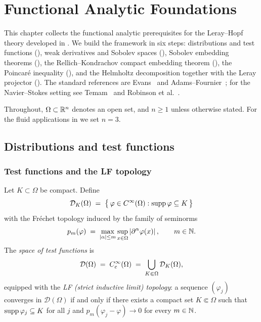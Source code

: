 \chapter{Functional Analytic Foundations}\label{ch:foundations}

This chapter collects the functional analytic prerequisites for the Leray--Hopf theory
developed in .
We build the framework in six steps: distributions and test functions
(), weak derivatives and Sobolev spaces (),
Sobolev embedding theorems (), the Rellich--Kondrachov compact
embedding theorem (), the Poincar\'{e} inequality (),
and the Helmholtz decomposition together with the Leray projector ().
The standard references are Evans~\cite{evans2010} and Adams--Fournier~\cite{adams2003};
for the Navier--Stokes setting see Temam~\cite{temam2001} and Robinson et al.\
\cite{robinson2016}.

Throughout, $\Omega \subset \mathbb{R}^{n}$ denotes an open set, and $n \ge 1$ unless otherwise
stated.
For the fluid applications in  we set $n = 3$.

\section{Distributions and test functions}\label{sec:distributions}

\subsection{Test functions and the LF topology}

\begin{definition}\label{def:test-functions}
  Let $K \subset \Omega$ be compact.  Define
  \[
    \mathcal{D}_{K}(\Omega)
    \;=\;
    \bigl\{\,\varphi \in C^{\infty}(\Omega) : \operatorname{supp} \varphi \subseteq K\,\bigr\}
  \]
  with the Fr\'{e}chet topology induced by the family of seminorms
  \[
    p_{m}(\varphi)
    \;=\;
    \max_{\left\lvert \alpha \right\rvert \le m}
    \sup_{x \in \Omega} \left\lvert \partial^{\alpha}\varphi(x) \right\rvert,
    \qquad m \in \mathbb{N}.
  \]
  The \emph{space of test functions} is
  \[
    \mathcal{D}(\Omega)
    \;=\;
    C^\infty_c(\Omega)
    \;=\;
    \bigcup_{K \Subset \Omega} \mathcal{D}_{K}(\Omega),
  \]
  equipped with the \emph{LF (strict inductive limit) topology}: a sequence
  $(\varphi_{j})$ converges in $\mathcal{D}(\Omega)$ if and only if there exists a
  compact set $K \Subset \Omega$ such that $\operatorname{supp} \varphi_{j} \subseteq K$ for all $j$
  and $p_{m}(\varphi_{j} - \varphi) \to 0$ for every $m \in \mathbb{N}$.
\end{definition}

